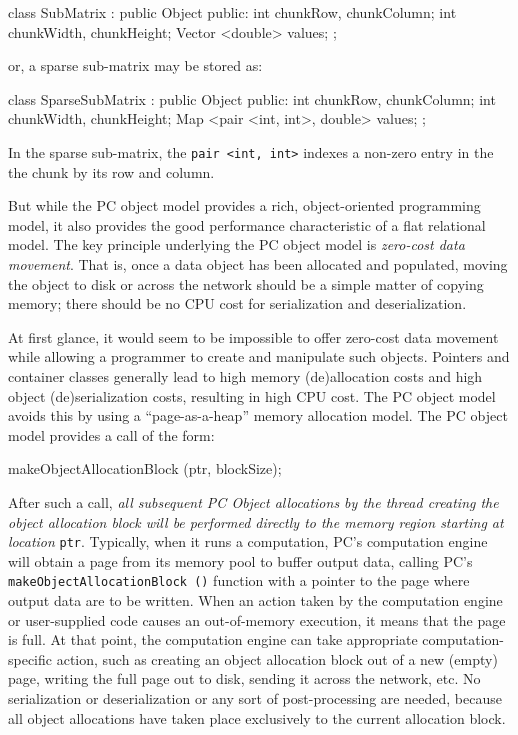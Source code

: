 \begin{codesmall}
class SubMatrix : public Object {
public:
	int chunkRow, chunkColumn;
	int chunkWidth, chunkHeight;
	Vector <double> values; 
};
\end{codesmall}

or, a sparse sub-matrix may be stored as:

\begin{codesmall}
class SparseSubMatrix : public Object {
public:
	int chunkRow, chunkColumn;
	int chunkWidth, chunkHeight;
	Map <pair <int, int>, double> values; 
};
\end{codesmall}

In the sparse sub-matrix, the \texttt{pair <int, int>} indexes a non-zero entry in the the chunk by its row and column.

But while the PC object model provides a rich, object-oriented programming model, it also provides the good performance characteristic
of a flat relational model.
The key principle underlying the PC object model is \emph{zero-cost data movement}.  That is, once a data object
has been allocated and populated, moving the object to disk or across
the network should be a simple matter of copying memory; there
should be no CPU cost for serialization and deserialization.

At first glance, it would seem to be impossible to offer zero-cost data movement while allowing a programmer to create and manipulate such objects.  
Pointers and container classes 
generally lead to high memory (de)allocation costs and high object (de)serialization costs, resulting in high CPU cost.
The PC object model avoids this 
by using a ``page-as-a-heap'' memory allocation model.  
The PC object model provides a call of the form:

\begin{codesmall}
makeObjectAllocationBlock (ptr, blockSize);
\end{codesmall}

After such a call, \emph{all subsequent PC Object allocations by the thread creating the object allocation block will be performed directly to the memory
region starting at location} \texttt{ptr}.
Typically, when it runs a computation, PC's computation engine will obtain a page from its memory pool to buffer output data, calling
PC's
\texttt{makeObjectAllocationBlock ()} function with a pointer to the page where output data are to be written.  
When an action taken by the computation engine or user-supplied code causes an
out-of-memory execution, it means that the page is full.  At that point, the computation engine can take appropriate computation-specific 
action, such as creating 
an object allocation block out of a new (empty) page, writing the full page out to disk, sending it across the network, etc.  
No serialization or deserialization or any sort of post-processing are needed, 
because all object allocations have taken place exclusively to the current allocation block.  

